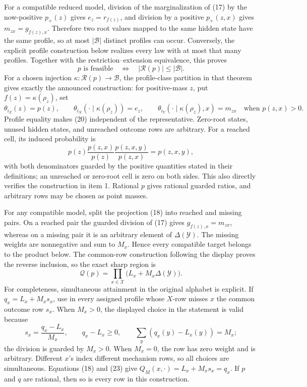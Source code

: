 For a compatible reduced model, division of the marginalization of (17)
by the now-positive \(p_+(z)\) gives \(e_z=r_{f(z)}\), and division by a
positive \(p_+(z,x)\) gives \(m_{zx}=g_{f(z),x}\).  Therefore two root
values mapped to the same hidden state have the same profile, so at most
\(|\mathcal B|\) distinct profiles can occur.  Conversely, the explicit
profile construction below realizes every law with at most that many
profiles.  Together with the restriction--extension equivalence, this
proves
\[
 p\text{ is feasible}
 \quad\Longleftrightarrow\quad
 |\mathcal R(p)|\leq|\mathcal B|.
\tag{19}
\]
For a chosen injection
\(\kappa:\mathcal R(p)\to\mathcal B\), the profile-class partition in
that theorem gives exactly the announced construction: for positive-mass
\(z\), put \(f(z)=\kappa(\rho_z)\), set
\[
 \theta_{i_Z}(z)=p(z),\qquad
 \theta_{i_X}(\cdot\mid\kappa(\rho_z))=e_z,
 \qquad
 \theta_{i_Y}(\cdot\mid\kappa(\rho_z),x)=m_{zx}
 \quad\text{when }p(z,x)>0.
\tag{20}
\]
Profile equality makes (20) independent of the representative.  Zero-root
states, unused hidden states, and unreached outcome rows are arbitrary.
For a reached cell, its induced probability is
\[
 p(z)\frac{p(z,x)}{p(z)}
       \frac{p(z,x,y)}{p(z,x)}=p(z,x,y),
\tag{21}
\]
with both denominators guarded by the positive quantities stated in their
definitions; an unreached or zero-root cell is zero on both sides.  This
also directly verifies the construction in item 1.  Rational \(p\) gives
rational guarded ratios, and arbitrary rows may be chosen as point masses.

For any compatible model, split the projection (18) into reached and
missing pairs.  On a reached pair the guarded division of (17) gives
\(g_{f(z),x}=m_{zx}\), whereas on a missing pair it is an arbitrary
element of \(\Delta(\mathcal Y)\).  The missing weights are nonnegative
and sum to \(M_x\).  Hence every compatible target belongs to the product
below.  The common-row construction following the display proves the
reverse inclusion, so the exact sharp region is
\[
 \mathcal Q(p)=
 \prod_{x\in\mathcal X}\bigl(L_x+M_x\Delta(\mathcal Y)\bigr).
\tag{22}
\]
For completeness, simultaneous attainment in the original alphabet is
explicit.  If \(q_x=L_x+M_xs_x\), use in every assigned profile whose
\(X\)-row misses \(x\) the common outcome row \(s_x\).  When \(M_x>0\),
the displayed choice in the statement is valid because
\[
 s_x=\frac{q_x-L_x}{M_x},\qquad
 q_x-L_x\geq0,\qquad
 \sum_y(q_x(y)-L_x(y))=M_x;
\tag{23}
\]
the division is guarded by \(M_x>0\).  When \(M_x=0\), the row has zero
weight and is arbitrary.  Different \(x\)'s index different mechanism
rows, so all choices are simultaneous.  Equations (18) and (23) give
\(Q_M(x,\cdot)=L_x+M_xs_x=q_x\).  If \(p\) and \(q\) are rational, then
so is every row in this construction.

